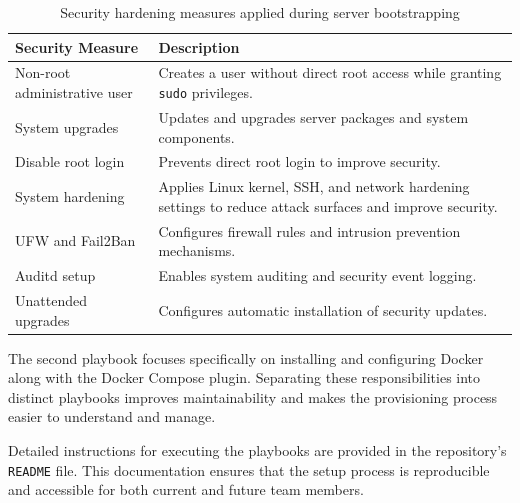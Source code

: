 \begin{table}[h]
\centering
\begin{tabular}{|p{4cm}|p{9cm}|}
\hline
\textbf{Security Measure} & \textbf{Description} \\
\hline
Non-root administrative user & Creates a user without direct root access while granting \texttt{sudo} privileges. \\
\hline
System upgrades & Updates and upgrades server packages and system components. \\
\hline
Disable root login & Prevents direct root login to improve security. \\
\hline
System hardening & Applies Linux kernel, SSH, and network hardening settings to reduce attack surfaces and improve security. \\
\hline
UFW and Fail2Ban & Configures firewall rules and intrusion prevention mechanisms. \\
\hline
Auditd setup & Enables system auditing and security event logging. \\
\hline
Unattended upgrades & Configures automatic installation of security updates. \\
\hline
\end{tabular}
\caption{Security hardening measures applied during server bootstrapping}
\label{tab:security_measures}
\end{table}

The second playbook focuses specifically on installing and configuring Docker along with the Docker Compose plugin. Separating these responsibilities into distinct playbooks improves maintainability and makes the provisioning process easier to understand and manage.

Detailed instructions for executing the playbooks are provided in the repository's \texttt{README} file. This documentation ensures that the setup process is reproducible and accessible for both current and future team members.

